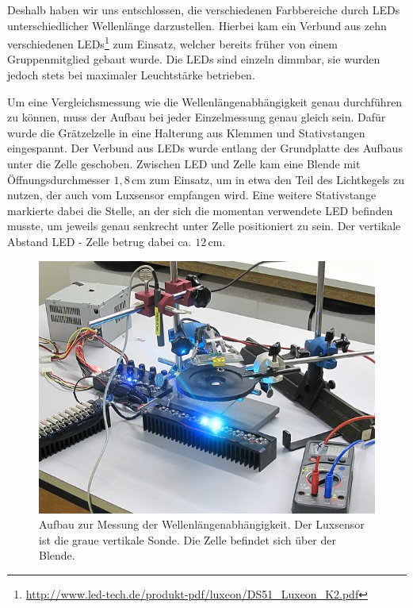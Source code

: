 \documentclass[11pt]{scrartcl}
\newcommand{\unit}[1]{\ensuremath{\,\mathrm{#1}}} %
\begin{document}
Deshalb haben wir uns entschlossen, die verschiedenen Farbbereiche durch LEDs unterschiedlicher Wellenl\"ange darzustellen. Hierbei kam ein Verbund aus zehn verschiedenen LEDs\footnote{\url{http://www.led-tech.de/produkt-pdf/luxeon/DS51\_Luxeon\_K2.pdf}} zum Einsatz, welcher bereits fr\"uher von einem Gruppenmitglied gebaut wurde.
Die LEDs sind einzeln dimmbar, sie wurden jedoch stets bei maximaler Leuchtst\"arke betrieben.

Um eine Vergleichsmessung wie die Wellenl\"angenabh\"angigkeit genau durchf\"uhren zu k\"onnen, muss der Aufbau bei jeder Einzelmessung genau gleich sein. Daf\"ur wurde die Gr\"atzelzelle in eine Halterung aus Klemmen und Stativstangen eingespannt. Der Verbund aus LEDs wurde entlang der Grundplatte des Aufbaus unter die Zelle geschoben. Zwischen LED und Zelle kam eine Blende mit \"Offnungsdurchmesser $1,8\unit{cm}$ zum Einsatz, um in etwa den Teil des Lichtkegels zu nutzen, der auch vom Luxsensor empfangen wird. Eine weitere Stativstange markierte dabei die Stelle, an der sich die momentan verwendete LED befinden musste, um jeweils genau senkrecht unter Zelle positioniert zu sein. Der vertikale Abstand LED - Zelle betrug dabei ca. $12\unit{cm}$.

\begin{figure}[ht]
\begin{center}
\includegraphics[width=1.0\textwidth]{images/messung_farben.jpg}
\end{center}
\vspace{-1.5\baselineskip}
\caption{Aufbau zur Messung der Wellenlängenabhängigkeit. Der Luxsensor ist die graue vertikale Sonde. Die Zelle befindet sich über der Blende.}
\label{messung_farben}
\end{figure}
\end{document}
